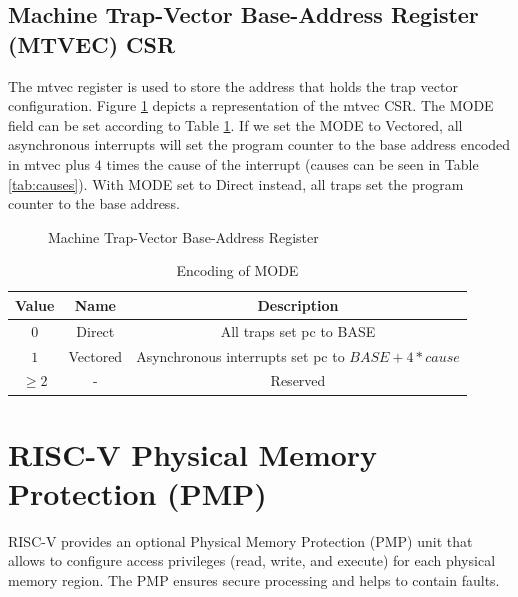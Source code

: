 \subsection{Machine Trap-Vector Base-Address Register (MTVEC) CSR}
\label{subsec:mtvec}

The mtvec register is used to store the address that holds the trap vector
configuration. Figure \ref{fig:mtvec} depicts a representation of the mtvec CSR.
The MODE field can be set according to Table \ref{tab:mode}. If we set the MODE to
Vectored, all asynchronous interrupts will set the program counter to the base
address encoded in mtvec plus $4$ times the cause of the interrupt (causes can be
seen in Table \ref{tab:causes}). With MODE set to Direct instead, all traps set
the program counter to the base address.

\begin{figure}[htbp]
  \centering
  \def\stackalignment{r} %
  {\scriptsize }
  \caption{Machine Trap-Vector Base-Address Register}
  \label{fig:mtvec}
\end{figure}

\begin{table}
  \centering
  \begin{tabular}{|c|c|c|}
    \hline
    \textbf{Value} & \textbf{Name} & \textbf{Description}                             \\
    \hline
    $0$            & Direct        & All traps set pc to BASE                         \\
    \hline
    $1$            & Vectored      & Asynchronous interrupts set pc to $BASE+4*cause$ \\
    \hline
    $\geq 2$       & -             & Reserved                                         \\
    \hline
  \end{tabular}
  \caption{Encoding of MODE}
  \label{tab:mode}
\end{table}

\section{RISC-V Physical Memory Protection (PMP)}
\label{sec:riscv_pmp}

RISC-V provides an optional Physical Memory Protection (PMP) unit that allows to
configure access privileges (read, write, and execute) for each physical memory region.
The PMP ensures secure processing and helps to contain faults.

